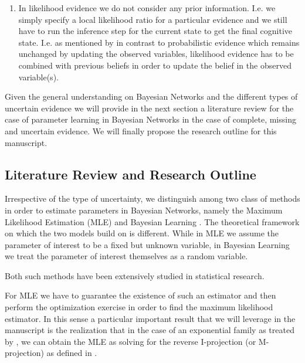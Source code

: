 \documentclass[11pt]{article}
\begin{document}
\begin{article}
\begin{enumerate}
\item In likelihood evidence we do not consider any prior
information. I.e. we simply specify a local likelihood ratio for
a particular evidence and we still have to run the inference step
for the current state to get the final cognitive state. I.e. as
mentioned by \cite{Mrad_2015} in contrast to probabilistic evidence
which remains unchanged by updating the observed variables,
likelihood evidence has to be combined with previous beliefs in
order to update the belief in the observed variable(s).
\end{enumerate}

Given the general understanding on Bayesian Networks and the
different types of uncertain evidence we will provide in the next
section a literature review for the case of parameter learning in
Bayesian Networks in the case of complete, missing and uncertain
evidence. We will finally propose the research outline for this
manuscript. 

\subsection{Literature Review and Research Outline}
\label{literature_review}
Irrespective of the type of uncertainty, we distinguish among two
class of methods in order to estimate parameters in Bayesian
Networks, namely the Maximum Likelihood Estimation (MLE)
\cite{spiegelhalter1990sequential} and Bayesian Learning
\cite{Smith_2001}. The theoretical framework on which the two models
build on is different. While in MLE we assume the parameter of
interest to be a fixed but unknown variable, in Bayesian Learning
we treat the parameter of interest themselves as a random
variable.

Both such methods have been extensively studied in statistical
research.

For MLE we have to guarantee the existence of such an estimator and
then perform the optimization exercise in order to find the maximum
likelihood estimator. In this sense a particular important result
that we will leverage in the manuscript is the realization that in
the case of an exponential family as treated by
\cite{barndorff1978hyperbolic}, we can obtain the MLE as solving for
the reverse I-projection (or M-projection) as defined in
\cite{csiszar1975divergence}.


\end{article}
\end{document}

